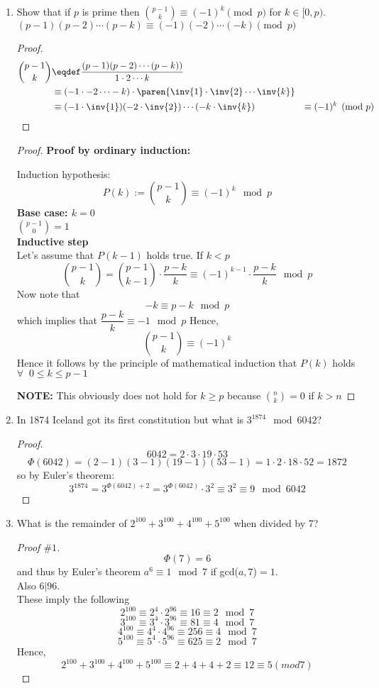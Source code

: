 \documentclass[12pt]{article}
\author{Sigtryggur Kjartansson}
\theoremstyle{definition}
\begin{document}
\begin{enumerate}

\item Show that if $p$ is prime then $\binom{p-1}{k} \equiv(-1)^k
  \pmod p$ for $k \in [0,p)$.
\hint $(p-1)(p-2)\cdots(p-k) \equiv (-1)(-2)\cdots (-k) \pmod p$

\begin{proof}

\begin{align*}
\binom{p-1}{k}
 & \eqdef \frac{(p-1)(p-2)\cdots(p-k))}{1\cdot 2 \cdots k}\\
 & \equiv (-1\cdot -2\cdots -k) \cdot \paren{\inv{1}\cdot \inv{2} \cdots \inv{k}}\\
 & \equiv (-1 \cdot \inv{1})(-2\cdot \inv{2})\cdots (-k \cdot \inv{k})
 & \equiv (-1)^k \pmod p
\end{align*}

\end{proof}


\begin{proof}
\textbf{Proof by ordinary induction:}

Induction hypothesis: $$P(k):={p-1 \choose k}\equiv(-1)^k \mod p$$
\textbf{Base case: $k=0$}\\
${p-1 \choose 0}=1$
\\
\textbf{Inductive step}\\
Let's assume that $P(k-1)$ holds true.
If $k<p$
$${p-1 \choose k}={p-1 \choose k-1}\cdot\frac{p-k}{k}\equiv (-1)^{k-1}\cdot\frac{p-k}{k} \mod p$$
Now note that $$-k \equiv p-k \mod p$$
which implies that $\dfrac{p-k}{k} \equiv -1 \mod p$
Hence,
$${p-1 \choose k}\equiv (-1)^k$$
Hence it follows by the principle of mathematical induction that $P(k)$ holds $\forall\;\;  0\leq k \leq p-1$

\textbf{NOTE:} This obviously does not hold for $k\geq p$ because ${n \choose k}=0$ if $k>n$
\end{proof}


\item In 1874 Iceland got its first constitution but what is $3^{1874}
  \mod 6042$?

\begin{proof}
$$6042=2\cdot3\cdot19\cdot53$$
$$\Phi(6042)=(2-1)(3-1)(19-1)(53-1)=1\cdot2\cdot18\cdot52=1872$$
so by Euler's theorem: 
$$3^{1874}=3^{\Phi(6042)+2}=3^{\Phi(6042)}\cdot 3^2 \equiv 3^2\equiv 9 \mod 6042$$
\end{proof}

\item What is the remainder of $2^{100}+3^{100}+4^{100}+5^{100}$ when
  divided by 7?
\begin{proof}[Proof $\#1$]
$$\Phi(7)=6$$
and thus by Euler's theorem $a^6\equiv1 \mod 7$ if gcd($a,7$)$=1$.\\
Also $6|96$.\\
These imply the following
$$2^{100}\equiv 2^4\cdot2^{96}\equiv 16\equiv 2\mod7$$
$$3^{100}\equiv 3^4\cdot3^{96}\equiv 81 \equiv 4 \mod7$$
$$4^{100}\equiv 4^4\cdot4^{96}\equiv 256\equiv 4 \mod7$$
$$5^{100}\equiv 5^4\cdot5^{96}\equiv 625 \equiv 2\mod7$$
Hence,
$$2^{100}+3^{100}+4^{100}+5^{100}\equiv 2+4+4+2\equiv 12 \equiv 5 (mod7)$$
\end{proof}


\end{enumerate}
\end{document}
